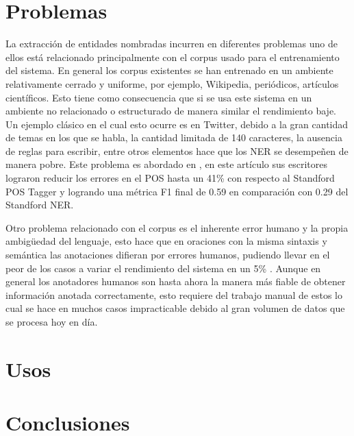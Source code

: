 \documentclass[runningheads]{llncs}
\begin{document}
\section{Problemas}

La extracción de entidades nombradas incurren en diferentes problemas uno de ellos está relacionado principalmente con el corpus usado para el entrenamiento del sistema. En general los corpus existentes se han entrenado en un ambiente relativamente cerrado y uniforme, por ejemplo, Wikipedia, periódicos, artículos científicos. Esto tiene como consecuencia que si se usa este sistema en un ambiente no relacionado o estructurado de manera similar el rendimiento baje. Un ejemplo clásico en el cual esto ocurre es en Twitter, debido a la gran cantidad de temas en los que se habla, la cantidad limitada de 140 caracteres, la ausencia de reglas para escribir,  entre otros elementos hace que los NER se desempeñen de manera pobre. Este problema es abordado en \cite{tweeter}, en este artículo sus escritores lograron reducir los errores en el POS hasta un 41\% con respecto al Standford POS Tagger y logrando una métrica F1 final de 0.59 en comparación con 0.29 del Standford NER.

Otro problema relacionado con el corpus es el inherente error humano y la propia ambigüedad del lenguaje, esto hace que en oraciones con la misma sintaxis y semántica las anotaciones difieran por errores humanos, pudiendo llevar en el peor de los casos a variar el rendimiento del sistema en un 5\% \cite{posdecisiontree}. Aunque en general los anotadores humanos son hasta ahora la manera más fiable de obtener información anotada correctamente, esto requiere del trabajo manual de estos lo cual se hace en muchos casos impracticable debido al gran volumen de datos que se procesa hoy en día.

\section{Usos}


\section{Conclusiones}

\end{document}
